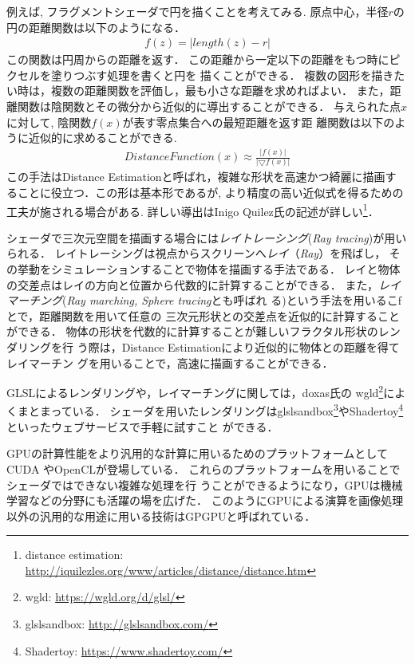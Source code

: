 例えば, フラグメントシェーダで円を描くことを考えてみる.
原点中心，半径$r$の円の距離関数は以下のようになる．
\begin{eqnarray*}
 f(z) = | length(z) - r |
\end{eqnarray*}
この関数は円周からの距離を返す．
この距離から一定以下の距離をもつ時にピクセルを塗りつぶす処理を書くと円を
描くことができる．
複数の図形を描きたい時は，複数の距離関数を評価し，最も小さな距離を求めればよい．
また，距離関数は陰関数とその微分から近似的に導出することができる．
与えられた点$x$に対して, 陰関数$f(x)$が表す零点集合への最短距離を返す距
離関数は以下のように近似的に求めることができる.
\begin{eqnarray*}
 DistanceFunction(x) \approx \frac{|f(x)|}{|\bigtriangledown f(x)|}
\end{eqnarray*}
この手法はDistance Estimationと呼ばれ，複雑な形状を高速かつ綺麗に描画す
ることに役立つ．この形は基本形であるが, より精度の高い近似式を得るための
工夫が施される場合がある.
詳しい導出はInigo Quilez氏の記述が詳しい\footnote{distance estimation: \url{http://iquilezles.org/www/articles/distance/distance.htm}}．

シェーダで三次元空間を描画する場合には\emph{レイトレーシング}({\it Ray
tracing})が用いられる．
レイトレーシングは視点からスクリーンへ\emph{レイ}（{\it Ray}）を飛ばし，
その挙動をシミュレーションすることで物体を描画する手法である．
レイと物体の交差点はレイの方向と位置から代数的に計算することができる．
また，\emph{レイマーチング}({\it Ray marching, Sphere tracing}とも呼ばれ
る)\cite{sphereTracing}という手法を用いるこfとで，距離関数を用いて任意の
三次元形状との交差点を近似的に計算することができる．
物体の形状を代数的に計算することが難しいフラクタル形状のレンダリングを行
う際は，Distance Estimationにより近似的に物体との距離を得てレイマーチン
グを用いることで，高速に描画することができる．

GLSLによるレンダリングや，レイマーチングに関しては，doxas氏の
wgld\footnote{wgld: \url{https://wgld.org/d/glsl/}}によくまとまっている．
シェーダを用いたレンダリングはglslsandbox\footnote{glslsandbox:
\url{http://glslsandbox.com/}}やShadertoy\footnote{Shadertoy:
\url{https://www.shadertoy.com/}}といったウェブサービスで手軽に試すこと
ができる．

GPUの計算性能をより汎用的な計算に用いるためのプラットフォームとしてCUDA
やOpenCLが登場している．
これらのプラットフォームを用いることでシェーダではできない複雑な処理を行
うことができるようになり，GPUは機械学習などの分野にも活躍の場を広げた．
このようにGPUによる演算を画像処理以外の汎用的な用途に用いる技術はGPGPUと呼ばれている．

